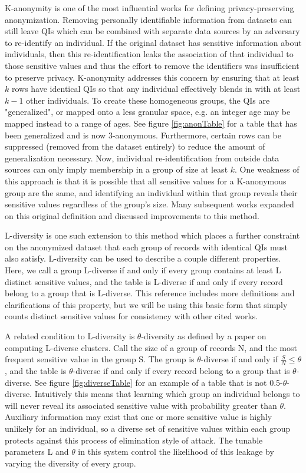 K-anonymity\cite{sweeneykAnonymity} is one of the most influential works for defining privacy-preserving anonymization. Removing personally identifiable information from datasets can still leave QIs which can be combined with separate data sources by an adversary to re-identify an individual. If the original dataset has sensitive information about individuals, then this re-identification leaks the association of that individual to those sensitive values and thus the effort to remove the identifiers was insufficient to preserve privacy. K-anonymity addresses this concern by ensuring that at least $k$ rows have identical QIs so that any individual effectively blends in with at least $k-1$ other individuals. To create these homogeneous groups, the QIs are "generalized", or mapped onto a less granular space, e.g. an integer age may be mapped instead to a range of ages. See figure \ref{fig:anonTable} for a table that has been generalized and is now 3-anonymous. Furthermore, certain rows can be suppressed (removed from the dataset entirely) to reduce the amount of generalization necessary. Now, individual re-identification from outside data sources can only imply membership in a group of size at least $k$. One weakness of this approach is that it is possible that all sensitive values for a K-anonymous group are the same, and identifying an individual within that group reveals their sensitive values regardless of the group's size. Many subsequent works expanded on this original definition and discussed improvements to this method.

L-diversity\cite{machanavajjhalalDiversity} is one such extension to this method which places a further constraint on the anonymized dataset that each group of records with identical QIs must also satisfy. L-diversity can be used to describe a couple different properties. Here, we call a group L-diverse if and only if every group contains at least L distinct sensitive values, and the table is L-diverse if and only if every record belong to a group that is L-diverse. This reference includes more definitions and clarifications of this property, but we will be using this basic form that simply counts distinct sensitive values for consistency with other cited works.

A related condition to L-diversity is $\theta$-diversity as defined by a paper\cite{yangEnhanced} on computing L-diverse clusters. Call the size of a group of records N, and the most frequent sensitive value in the group S. The group is $\theta$-diverse if and only if $\frac{S}{N}\leq\theta$, and the table is $\theta$-diverse if and only if every record belong to a group that is $\theta$-diverse. See figure \ref{fig:diverseTable} for an example of a table that is not 0.5-$\theta$-diverse. Intuitively this means that learning which group an individual belongs to will never reveal its associated sensitive value with probability greater than $\theta$. Auxiliary information may exist that one or more sensitive value is highly unlikely for an individual, so a diverse set of sensitive values within each group protects against this process of elimination style of attack. The tunable parameters L and $\theta$ in this system control the likelihood of this leakage by varying the diversity of every group.

